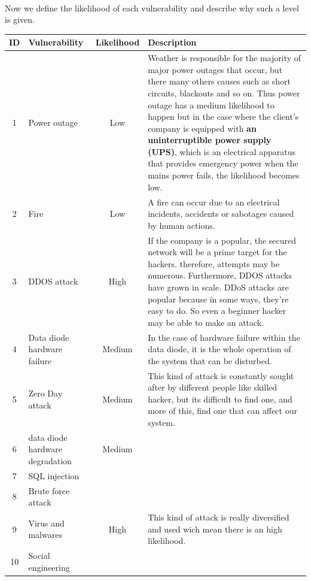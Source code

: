 \documentclass[a4paper,10pt]{article}
\begin{document}
\paragraph{} Now we define the likelihood of each vulnerability and describe why such a level is given.

\begin{table}[!h]
	\centering
	\begin{tabular}{|c|p{}|c|p{10cm}|}
		\hline
		\textbf{ID}& \textbf{Vulnerability} & \textbf{Likelihood} & \textbf{Description}                 \\
		\hline
		1 & Power outage & Low & Weather is responsible for the majority of major power outages that occur, but there many others causes such as short circuits, blackouts and so on. Thus power outage has a medium likelihood to happen but in the case where the client's company is equipped with \textbf{an uninterruptible power supply (UPS)}, which is an electrical apparatus that provides emergency power when the mains power fails, the likelihood becomes low.    \\
		\hline
		2 & Fire & Low  &  A fire can occur due to an electrical incidents, accidents or sabotages caused by human actions.\\
		\hline
		3 & DDOS attack & High & If the company is a popular, the secured network will be a prime target for the hackers. therefore, attempts may be numerous. Furthermore, DDOS attacks have grown in scale. DDoS attacks are popular because in some ways, they're easy to do. So even a beginner hacker may be able to make an attack.\\
		\hline
		4 & Data diode hardware failure  & Medium & In the case of hardware failure within the data diode, it is the whole operation of the system that can be disturbed.\\
		\hline
		5 & Zero Day attack & Medium & This kind of attack is constantly sought after by different people like skilled hacker, but its difficult to find one, and more of this, find one that can affect our system. \\
		\hline
		6 & data diode hardware degradation & Medium & \\
		\hline
		7 &  SQL injection &  &   \\
		\hline
		8 & Brute force attack &  & \\
		\hline
		9 & Virus and malwares & High & This kind of attack is really diversified and used wich mean there is an high likelihood. \\
		\hline
		10 & Social engineering  &  & \\

\end{tabular}
\end{table}
\end{document}
